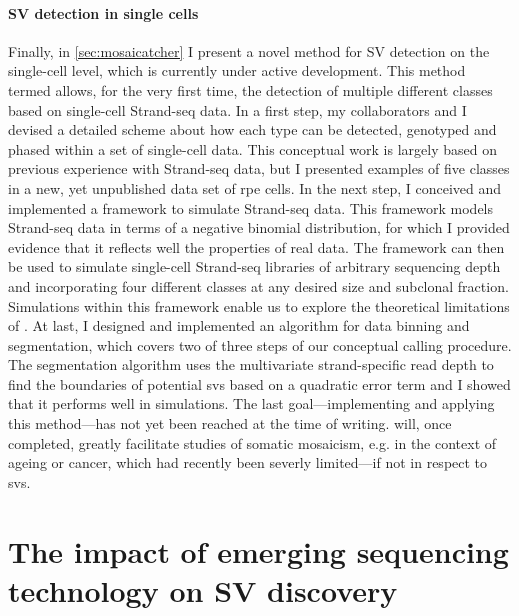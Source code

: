 \paragraph{SV detection in single cells}
Finally, in \cref{sec:mosaicatcher} I present a novel method for SV detection on
the single-cell level, which is currently under active development. This method
termed \mc allows, for the very first time, the detection of
multiple different \sv classes based on single-cell Strand-seq data. In a first
step, my collaborators and I devised a detailed scheme about how each \sv type
can be detected, genotyped and phased within a set of single-cell data. This
conceptual work is largely based on previous experience with Strand-seq data,
but I presented examples of five \sv classes in a new, yet
unpublished data set of \acl{rpe} cells. In the next step, I conceived and
implemented a framework to simulate Strand-seq data. This framework models
Strand-seq data in terms of a negative binomial distribution, for which I
provided evidence that it reflects well the properties of real data. The
framework can then be used to simulate single-cell Strand-seq libraries of
arbitrary sequencing depth and incorporating four
different \sv classes at any desired size and subclonal fraction. Simulations
within this framework enable us to explore the theoretical limitations of
\mc. At last, I designed and implemented an algorithm for data binning
and segmentation, which covers two of three steps of our conceptual \sv calling
procedure. The segmentation algorithm uses the multivariate strand-specific read
depth to find the boundaries of potential \acp{sv} based on a quadratic error
term and I showed that it performs well in
simulations. The last goal---implementing and applying this method---has not yet
been reached at the time of writing. \mc will, once completed, greatly
facilitate studies of somatic mosaicism, e.g. in the context of ageing or cancer,
which had recently been severly limited---if not in respect to \acp{sv}.






\section{The impact of emerging sequencing technology on SV discovery}
\label{sec:impact}

